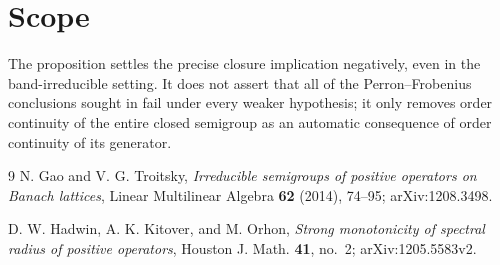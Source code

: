 \documentclass[11pt]{article}
\begin{document}
\section{Scope}

The proposition settles the precise closure implication negatively, even in
the band-irreducible setting.  It does not assert that all of the
Perron--Frobenius conclusions sought in \cite{GT} fail under every weaker
hypothesis; it only removes order continuity of the entire closed semigroup
as an automatic consequence of order continuity of its generator.

\begin{thebibliography}{9}
N. Gao and V. G. Troitsky,
\emph{Irreducible semigroups of positive operators on Banach lattices},
Linear Multilinear Algebra \textbf{62} (2014), 74--95;
arXiv:1208.3498.

D. W. Hadwin, A. K. Kitover, and M. Orhon,
\emph{Strong monotonicity of spectral radius of positive operators},
Houston J. Math. \textbf{41}, no.~2;
arXiv:1205.5583v2.
\end{thebibliography}
\end{document}
